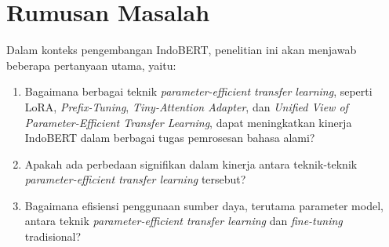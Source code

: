 \section{Rumusan Masalah}

Dalam konteks pengembangan IndoBERT, penelitian ini akan menjawab beberapa pertanyaan utama, yaitu:

\begin{enumerate}
    \item Bagaimana berbagai teknik \textit{parameter-efficient transfer learning}, seperti LoRA, \textit{Prefix-Tuning}, \textit{Tiny-Attention Adapter}, dan \textit{Unified View of Parameter-Efficient Transfer Learning}, dapat meningkatkan kinerja IndoBERT dalam berbagai tugas pemrosesan bahasa alami?
    \item Apakah ada perbedaan signifikan dalam kinerja antara teknik-teknik \textit{parameter-efficient transfer learning} tersebut?
    \item Bagaimana efisiensi penggunaan sumber daya, terutama parameter model, antara teknik \textit{parameter-efficient transfer learning} dan \textit{fine-tuning} tradisional?
\end{enumerate}